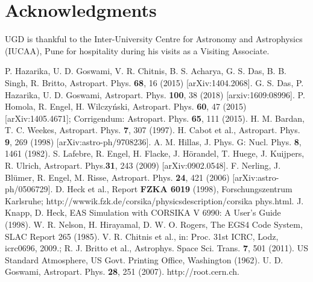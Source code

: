 \documentclass[amsmath,amssymb,showpacs,showkeywords]{revtex4}
\begin{document}
\section*{Acknowledgments}
UGD is thankful to the Inter-University Centre for Astronomy and Astrophysics 
(IUCAA), Pune for hospitality during his visits as a Visiting Associate.

\begin{thebibliography}{99}
P. Hazarika, U. D. Goswami, V. R. Chitnis, B. S. Acharya, G. S. Das, B. B. 
Singh, R. Britto, Astropart. Phys. {\bf 68}, 16 (2015) [arXiv:1404.2068].
G. S. Das, P. Hazarika, U. D. Goswami, Astropart. Phys. {\bf 100}, 38 
(2018) [arxiv:1609:08996].
P. Homola, R. Engel, H. Wilczy\'nski, Astropart. Phys. {\bf 60}, 47 (2015) 
[arXiv:1405.4671]; Corrigendum: Astropart. Phys. {\bf 65}, 111 (2015). 
H. M. Bardan, T. C. Weekes, Astropart. Phys. {\bf 7}, 307 (1997). 
H. Cabot et al., Astropart. Phys. {\bf 9}, 269 (1998) [arXiv:astro-ph/9708236].
A. M. Hillas, J. Phys. G: Nucl. Phys. {\bf 8}, 1461 (1982).
S. Lafebre, R. Engel, H. Flacke, J. H\"orandel, T. Huege, J. Kuijpers, R. 
Ulrich, Astropart. Phys.{\bf 31}, 243 (2009) [arXiv:0902.0548].  
F. Nerling, J. Bl\"umer, R. Engel, M. Risse, Astropart. Phys. {\bf 24}, 421 
(2006) [arXiv:astro-ph/0506729].
D. Heck et al., Report {\bf FZKA 6019} (1998),
Forschungszentrum Karlsruhe; http://wwwik.fzk.de/corsika/physicsdescription/corsika phys.html.
J. Knapp, D. Heck, EAS Simulation with CORSIKA V 6990: A User's Guide (1998).
W. R. Nelson, H. Hirayamal, D. W. O. Rogers, The EGS4 Code System, SLAC Report
265 (1985).
V. R. Chitnis et al., in: Proc. 31st ICRC, Lodz, icrc0696, 2009.;
R. J. Britto et al., Astrophys. Space Sci. Trans. {\bf 7}, 501 (2011).
US Standard Atmosphere, US Govt. Printing Office, Washington (1962).
U. D. Goswami, Astropart. Phys. {\bf 28}, 251 (2007).
http://root.cern.ch.
\end{thebibliography}
\end{document}

